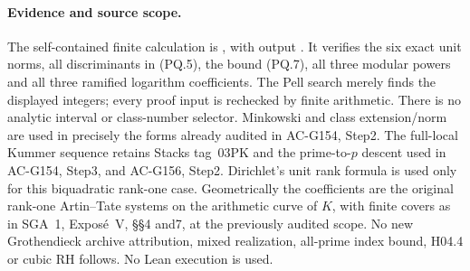 \paragraph{Evidence and source scope.}
The self-contained finite calculation is
, with output
.
It verifies the six exact unit norms, all discriminants in (PQ.5),
the bound (PQ.7), all three modular powers and all three ramified
logarithm coefficients.
The Pell search merely finds the displayed integers; every proof
input is rechecked by finite arithmetic.
There is no analytic interval or class-number selector.
Minkowski and class extension/norm are used in precisely the
forms already audited in AC-G154, Step2.
The full-local Kummer sequence retains Stacks tag~03PK and the
prime-to-$p$ descent used in AC-G154, Step3, and AC-G156, Step2.
Dirichlet's unit rank formula is used only for this biquadratic
rank-one case.
Geometrically the coefficients are the original rank-one
Artin--Tate systems on the arithmetic curve of $K$, with finite
covers as in SGA~1, Expos\'e~V, \S\S4 and7, at the previously
audited scope.  No new Grothendieck archive attribution, mixed
realization, all-prime index bound, H04.4 or cubic RH follows.
No Lean execution is used.
